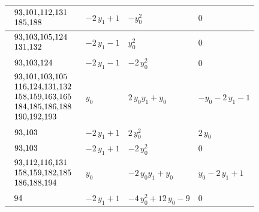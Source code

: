 \begin{table}[H]
\begin{center}
{\begin{tabular}{|l|l|l|l|}
$\begin{tabular}{l}
93,101,112,131 \\
185,188 \\
\end{tabular}$ & $ -2 \, y_{1} + 1 $ & $ -y_{0}^{2} $ & $ 0 $ \\ \hline
$\begin{tabular}{l}
93,103,105,124 \\
131,132 \\
\end{tabular}$ & $ -2 \, y_{1} - 1 $ & $ y_{0}^{2} $ & $ 0 $ \\ \hline
$\begin{tabular}{l}
93,103,124 \\
\end{tabular}$ & $ -2 \, y_{1} - 1 $ & $ -2 \, y_{0}^{2} $ & $ 0 $ \\ \hline
$\begin{tabular}{l}
93,101,103,105 \\
116,124,131,132 \\
158,159,163,165 \\
184,185,186,188 \\
190,192,193 \\
\end{tabular}$ & $ y_{0} $ & $ 2 \, y_{0} y_{1} + y_{0} $ & $ -y_{0} - 2 \, y_{1} - 1 $ \\ \hline
$\begin{tabular}{l}
93,103 \\
\end{tabular}$ & $ -2 \, y_{1} + 1 $ & $ 2 \, y_{0}^{2} $ & $ 2 \, y_{0} $ \\ \hline
$\begin{tabular}{l}
93,103 \\
\end{tabular}$ & $ -2 \, y_{1} + 1 $ & $ -2 \, y_{0}^{2} $ & $ 0 $ \\ \hline
$\begin{tabular}{l}
93,112,116,131 \\
158,159,182,185 \\
186,188,194 \\
\end{tabular}$ & $ y_{0} $ & $ -2 \, y_{0} y_{1} + y_{0} $ & $ y_{0} - 2 \, y_{1} + 1 $ \\ \hline
$\begin{tabular}{l}
94 \\
\end{tabular}$ & $ -2 \, y_{1} + 1 $ & $ -4 \, y_{0}^{2} + 12 \, y_{0} - 9 $ & $ 0 $ \\ \hline

\end{tabular}}
\end{center}
\end{table}
